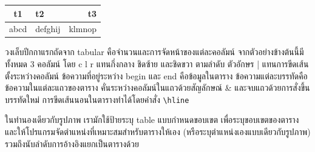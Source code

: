 \begin{tabular}{|c||lr|}
	t1		& t2	& t3 \\
	\hline
	abcd	& defghij	& klmnop \\
	\hline
\end{tabular}

วงเล็บปีกกาแรกถัดจาก tabular คือจำนวนและการจัดหน้าของแต่ละคอลัมน์ จากตัวอย่างข้างต้นนี้มีทั้งหมด 3 คอลัมน์ โดย c l r แทนกึ่งกลาง ชิดซ้าย และชิดขวา ตามลำดับ ตัวอักษร | แทนการขีดเส้นตั้งระหว่างคอลัมน์ ข้อความที่อยู่ระหว่าง begin และ end คือข้อมูลในตาราง ข้อความแต่ละบรรทัดคือข้อความในแต่ละแถวของตาราง คั่นระหว่างคอลัมน์ในแถวด้วยสัญลักษณ์ \& และจบแถวด้วยการสั่งขึ้นบรรทัดใหม่ การขีดเส้นนอนในตารางทำได้โดยคำสั่ง \lstinline|\hline|

ในทำนองเดียวกับรูปภาพ เรามักใช้ป้ายระบุ table แบบกำหนดขอบเขต เพื่อระบุขอบเขตของตาราง และให้โปรแกรมจัดตำแหน่งที่เหมาะสมสำหรับตารางให้เอง (หรือระบุตำแหน่งเองแบบเดียวกับรูปภาพ) รวมถึงนับลำดับการอ้างอิงแยกเป็นตารางด้วย
